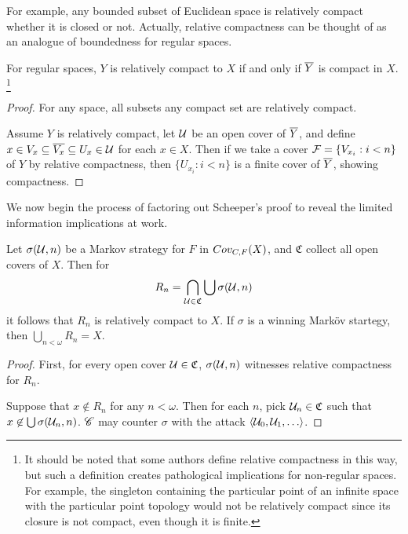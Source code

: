 For example, any bounded subset of Euclidean space is relatively compact
whether it is closed or not. Actually, relative compactness can be thought
of as an analogue of boundedness for regular spaces.

\begin{prop}
  For regular spaces, $Y$ is relatively compact to $X$ if and only if
  $\overline{Y}$ is compact in $X$.
  \footnote{
    It should be noted that some authors define relative compactness in
    this way, but such a definition creates pathological implications for
    non-regular spaces. For example, the singleton containing
    the particular point of an infinite space with the particular point topology
    would not be relatively compact since its closure is not compact, even
    though it is finite.
  }
\end{prop}

\begin{proof}
  For any space, all subsets any compact set are relatively compact.

  Assume $Y$ is relatively compact, let $\mathcal{U}$ be an open cover of $\overline{Y}$,
  and define $x\in V_x\subseteq \overline{V_x}\subseteq U_x \in \mathcal{U}$ for each
  $x\in X$. Then if we take a cover $\mathcal{F} = \{V_{x_i} : i<n\}$ of $Y$ by
  relative compactness, then $\{U_{x_i}:i<n\}$ is a finite cover of $\overline{Y}$,
  showing compactness.
\end{proof}

We now begin the process of factoring out Scheeper's proof to reveal the
limited information implications at work.

\begin{lem}
  Let $\sigma(\mathcal{U}, n)$ be a Markov strategy for $F$ in
  $Cov_{C,F}(X)$, and $\mathfrak{C}$ collect all open covers of $X$. Then for
    \[
      R_n = \bigcap_{\mathcal{U}\in\mathfrak{C}} \bigcup\sigma(\mathcal{U},n)
    \]
  it follows that $R_n$ is relatively compact to $X$. If $\sigma$ is a winning
  Mark\"ov startegy, then $\bigcup_{n<\omega} R_n = X$.
\end{lem}

\begin{proof}
  First, for every open cover $\mathcal{U}\in\mathfrak C$, $\sigma(\mathcal{U},n)$
  witnesses relative compactness for $R_n$.

  Suppose that $x \not\in R_n$ for any $n<\omega$. Then for each $n$,
  pick $\mathcal{U}_n\in\mathfrak{C}$ such that $x\not\in \bigcup\sigma(\mathcal{U}_n,n)$.
  $\mathscr{C}$ may counter $\sigma$ with the attack $\<\mc U_0,\mc U_1,\dots\>$.
\end{proof}

